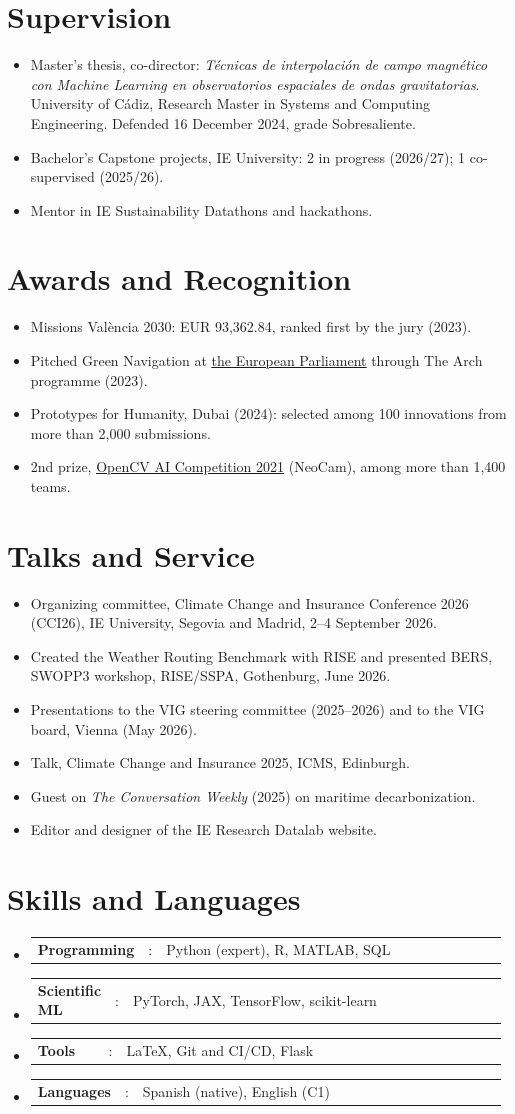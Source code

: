 \documentclass[a4paper,11pt]{article}
\newcommand{\resumeItem}[1]{
	\item\small{#1}
}
\newcommand{\resumeItemListStart}{\begin{itemize}[rightmargin=0.11in]}
\newcommand{\resumeItemListEnd}{\end{itemize}}
\newcommand{\resumeSectionType}[3]{
	\item\begin{tabular*}{0.96\textwidth}[t]{
			p{0.15\linewidth}p{0.02\linewidth}p{0.81\linewidth}
		}
		\textbf{#1} & #2 & #3
	\end{tabular*}\vspace{-2pt}
}
\newcommand{\resumeHeadingListStart}{
	\begin{itemize}[leftmargin=0.15in, label={}]
	}
\newcommand{\resumeHeadingListEnd}{\end{itemize}}
\begin{document}
	\section{Supervision}
	\resumeItemListStart{}
	\resumeItem{Master's thesis, co-director: \textit{T\'ecnicas de interpolaci\'on de campo magn\'etico con Machine Learning en observatorios espaciales de ondas gravitatorias}. University of C\'adiz, Research Master in Systems and Computing Engineering. Defended 16 December 2024, grade Sobresaliente.}
	\resumeItem{Bachelor's Capstone projects, IE University: 2 in progress (2026/27); 1 co-supervised (2025/26).}
	\resumeItem{Mentor in IE Sustainability Datathons and hackathons.}
	\resumeItemListEnd{}


	\section{Awards and Recognition}
	\resumeItemListStart{}
	\resumeItem{Missions Val\`encia 2030: EUR 93,362.84, ranked first by the jury (2023).}
	\resumeItem{Pitched Green Navigation at \href{https://www.youtube.com/watch?v=T2VRDSczxVM&t}{\uline{the European Parliament}} through The Arch programme (2023).}
	\resumeItem{Prototypes for Humanity, Dubai (2024): selected among 100 innovations from more than 2,000 submissions.}
	\resumeItem{2nd prize, \href{https://opencv.org/opencv-ai-competition-2021/\#regional-winners}{\uline{OpenCV AI Competition 2021}} (NeoCam), among more than 1,400 teams.}
	\resumeItemListEnd{}


	\section{Talks and Service}
	\resumeItemListStart{}
	\resumeItem{Organizing committee, Climate Change and Insurance Conference 2026 (CCI26), IE University, Segovia and Madrid, 2--4 September 2026.}
	\resumeItem{Created the Weather Routing Benchmark with RISE and presented BERS, SWOPP3 workshop, RISE/SSPA, Gothenburg, June 2026.}
	\resumeItem{Presentations to the VIG steering committee (2025--2026) and to the VIG board, Vienna (May 2026).}
	\resumeItem{Talk, Climate Change and Insurance 2025, ICMS, Edinburgh.}
	\resumeItem{Guest on \textit{The Conversation Weekly} (2025) on maritime decarbonization.}
	\resumeItem{Editor and designer of the IE Research Datalab website.}
	\resumeItemListEnd{}


	\section{Skills and Languages}
	\resumeHeadingListStart{}
	\resumeSectionType{Programming}{:}{Python (expert), R, MATLAB, SQL}
	\resumeSectionType{Scientific ML}{:}{PyTorch, JAX, TensorFlow, scikit-learn}
	\resumeSectionType{Tools}{:}{LaTeX, Git and CI/CD, Flask}
	\resumeSectionType{Languages}{:}{Spanish (native), English (C1)}
	\resumeHeadingListEnd{}
\end{document}

